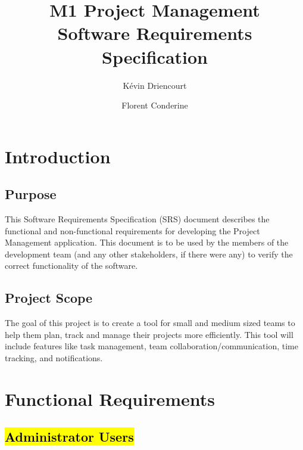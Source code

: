 \documentclass[]{article}
\title{\textbf{M1 Project Management} \\ \Large Software Requirements Specification}
\author{Kévin Driencourt \and Florent Conderine}
\begin{document}
    \maketitle

    \newpage

    \tableofcontents

    \newpage
    


    \section{Introduction}
        \subsection{Purpose}
            \sloppy This Software Requirements Specification (SRS) document describes the functional and non-functional requirements for developing the Project Management application. %
            This document is to be used by the members of the development team (and any other stakeholders, if there were any) to verify the correct functionality of the software.

        \subsection{Project Scope}
            The goal of this project is to create a tool for small and medium sized teams to help them plan, track and manage their projects more efficiently.
            This tool will include features like task management, team collaboration/communication, time tracking, and notifications.
            



    \newpage



    \section{Functional Requirements}
        \subsection{\hl{Administrator Users}}
\end{document}
